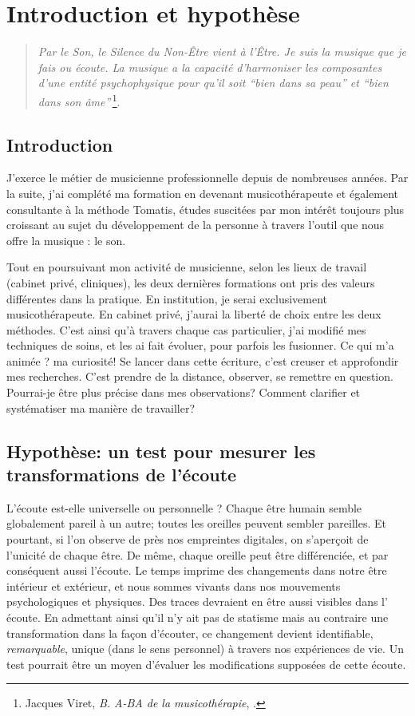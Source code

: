 \chapter{Introduction et hypothèse}
\begin{quotation}
\emph{Par le Son, le Silence du Non-Être vient à l'Être. Je suis
la musique que je fais ou écoute. La musique a la capacité d'harmoniser
les composantes d'une entité psychophysique pour qu'il soit ``bien
dans sa peau'' et ``bien dans son âme''}\,\footnote{Jacques Viret, \emph{B. A-BA de la musicothérapie}, \cite{Viret2007}.}.
\end{quotation}

\section{Introduction}

J'exerce le métier de musicienne professionnelle depuis de nombreuses
années. Par la suite, j'ai complété ma formation en devenant musicothérapeute et également consultante à la méthode Tomatis, 
études suscitées par mon intérêt toujours plus croissant au sujet du développement de la personne à travers l'outil 
que nous offre la musique : le son.



Tout en poursuivant mon activité de musicienne, selon les lieux de travail (cabinet privé, cliniques), les deux dernières formations ont pris des valeurs différentes dans la pratique. En institution, je serai exclusivement musicothérapeute. En cabinet
privé, j'aurai la liberté de choix entre les deux méthodes.
C'est ainsi qu'à travers chaque cas particulier,
j'ai modifié mes techniques de soins, et les ai fait évoluer,
pour parfois les fusionner. 
Ce qui m'a animée ? ma curiosité! Se lancer dans cette écriture, c'est creuser et approfondir mes recherches. C'est prendre de la distance, observer, se remettre en question.  Pourrai-je être plus précise dans mes observations? Comment clarifier et systématiser ma manière de travailler?


\section{Hypothèse: un test pour mesurer les transformations de l'écoute}

L'écoute est-elle universelle ou personnelle ? Chaque être humain semble  globalement pareil à un autre; toutes les oreilles peuvent sembler pareilles. Et pourtant, si l'on observe de près nos empreintes digitales, on s'aperçoit de l'unicité de chaque être. De même, chaque oreille peut être différenciée, et par conséquent aussi l'écoute. Le temps imprime des changements dans notre être intérieur et extérieur, et nous sommes vivants dans nos mouvements psychologiques et physiques. Des traces devraient en être aussi visibles dans l' écoute.
En admettant ainsi qu'il n'y ait pas de statisme mais au contraire une transformation dans la façon d'écouter, ce changement devient identifiable, \textit{remarquable}, unique (dans le sens personnel) à travers nos expériences de vie.  Un test pourrait être un moyen d'évaluer les modifications supposées de cette écoute. 


